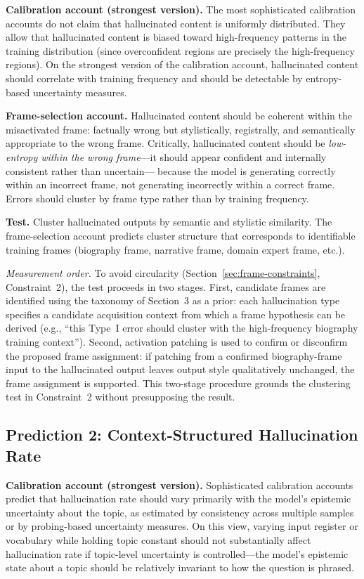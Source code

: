 \documentclass[12pt]{article}
\begin{document}
\textbf{Calibration account (strongest version).} The most
sophisticated calibration accounts \cite{kadavath2022, xiong2024}
do not claim that hallucinated content is uniformly distributed.
They allow that hallucinated content is biased toward high-frequency
patterns in the training distribution (since overconfident regions
are precisely the high-frequency regions). On the strongest version
of the calibration account, hallucinated content should correlate
with training frequency and should be detectable by entropy-based
uncertainty measures.

\textbf{Frame-selection account.} Hallucinated content should
be coherent within the misactivated frame: factually wrong
but stylistically, registrally, and semantically appropriate to
the wrong frame. Critically, hallucinated content should be
\emph{low-entropy within the wrong frame}---it should appear
confident and internally consistent rather than uncertain---
because the model is generating correctly within an incorrect frame,
not generating incorrectly within a correct frame. Errors should
cluster by frame type rather than by training frequency.

\textbf{Test.} Cluster hallucinated outputs by semantic and
stylistic similarity. The frame-selection account predicts
cluster structure that corresponds to identifiable training
frames (biography frame, narrative frame, domain expert frame,
etc.).

\emph{Measurement order.}
To avoid circularity (Section~\ref{sec:frame-constraints},
Constraint~2), the test proceeds in two stages.
First, candidate frames are identified using the taxonomy of
Section~3 as a prior: each hallucination type specifies a
candidate acquisition context from which a frame hypothesis
can be derived (e.g., ``this Type~I error should cluster with
the high-frequency biography training context'').
Second, activation patching is used to confirm or disconfirm
the proposed frame assignment: if patching from a confirmed
biography-frame input to the hallucinated output leaves output
style qualitatively unchanged, the frame assignment is supported.
This two-stage procedure grounds the clustering test in
Constraint~2 without presupposing the result.

\subsection{Prediction 2: Context-Structured Hallucination Rate}

\textbf{Calibration account (strongest version).} Sophisticated
calibration accounts \cite{lin2022, xiong2024} predict that
hallucination rate should vary primarily with the model's
epistemic uncertainty about the topic, as estimated by consistency
across multiple samples or by probing-based uncertainty measures.
On this view, varying input register or vocabulary while holding
topic constant should not substantially affect hallucination rate
if topic-level uncertainty is controlled---the model's epistemic
state about a topic should be relatively invariant to how the
question is phrased.
\end{document}

